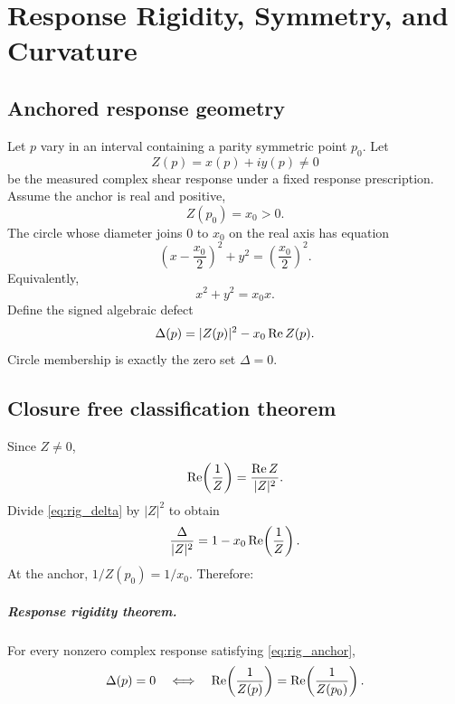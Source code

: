 \chapter{Response Rigidity, Symmetry, and Curvature}\label{ch:rigidity}

\section{Anchored response geometry}
Let $p$ vary in an interval containing a parity symmetric point $p_0$. Let
\begin{equation}
 Z(p)=x(p)+iy(p)\ne0
 \label{eq:rig_z}
\end{equation}
be the measured complex shear response under a fixed response prescription. Assume the anchor is real and positive,
\begin{equation}
 Z(p_0)=x_0>0.
 \label{eq:rig_anchor}
\end{equation}
The circle whose diameter joins $0$ to $x_0$ on the real axis has equation
\begin{equation}
 \left(x-\frac{x_0}{2}\right)^2+y^2
 =\left(\frac{x_0}{2}\right)^2.
 \label{eq:rig_circle_center}
\end{equation}
Equivalently,
\begin{equation}
 x^2+y^2=x_0x.
 \label{eq:rig_circle}
\end{equation}
Define the signed algebraic defect
\begin{equation}
 \Delta(p)=|Z(p)|^2-x_0\operatorname{Re} Z(p).
 \label{eq:rig_delta}
\end{equation}
Circle membership is exactly the zero set $\Delta=0$.

\section{Closure free classification theorem}
Since $Z\ne0$,
\begin{equation}
 \operatorname{Re}\!\left(\frac1Z\right)
 =\frac{\operatorname{Re} Z}{|Z|^2}.
 \label{eq:rig_inverse_real}
\end{equation}
Divide \cref{eq:rig_delta} by $|Z|^2$ to obtain
\begin{equation}
 \frac{\Delta}{|Z|^2}
 =1-x_0\operatorname{Re}\!\left(\frac1Z\right).
 \label{eq:rig_master_identity}
\end{equation}
At the anchor, $1/Z(p_0)=1/x_0$. Therefore:

\paragraph{Response rigidity theorem.}
For every nonzero complex response satisfying \cref{eq:rig_anchor},
\begin{equation}
 \Delta(p)=0
 \quad\Longleftrightarrow\quad
 \operatorname{Re}\!\left(\frac1{Z(p)}\right)
 =\operatorname{Re}\!\left(\frac1{Z(p_0)}\right).
 \label{eq:rig_theorem}
\end{equation}

